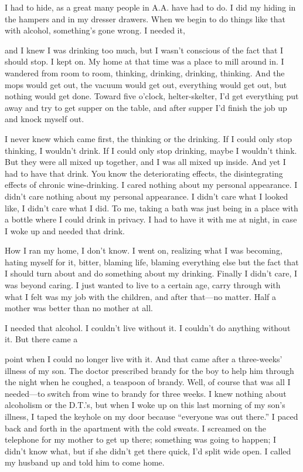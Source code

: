 I had to hide, as a great many people in A.A. have had to do. I did my hiding in the hampers and in my dresser drawers. When we begin to do things like that with alcohol, something’s gone wrong. I needed it,

and I knew I was drinking too much, but I wasn’t conscious of the fact that I should stop. I kept on. My home at that time was a place to mill around in. I wandered from room to room, thinking, drinking, drinking, thinking. And the mops would get out, the vacuum would get out, everything would get out, but nothing would get done. Toward five o’clock, helter-skelter, I’d get everything put away and try to get supper on the table, and after supper I’d finish the job up and knock myself out.

I never knew which came first, the thinking or the drinking. If I could only stop thinking, I wouldn’t drink. If I could only stop drinking, maybe I wouldn’t think. But they were all mixed up together, and I was all mixed up inside. And yet I had to have that drink. You know the deteriorating effects, the disintegrating effects of chronic wine-drinking. I cared nothing about my personal appearance. I didn’t care nothing about my personal appearance. I didn’t care what I looked like, I didn’t care what I did. To me, taking a bath was just being in a place with a bottle where I could drink in privacy. I had to have it with me at night, in case I woke up and needed that drink.

How I ran my home, I don’t know. I went on, realizing what I was becoming, hating myself for it, bitter, blaming life, blaming everything else but the fact that I should turn about and do something about my drinking. Finally I didn’t care, I was beyond caring. I just wanted to live to a certain age, carry through with what I felt was my job with the children, and after that—no matter. Half a mother was better than no mother at all.

I needed that alcohol. I couldn’t live without it. I couldn’t do anything without it. But there came a

point when I could no longer live with it. And that came after a three-weeks’ illness of my son. The doctor prescribed brandy for the boy to help him through the night when he coughed, a teaspoon of brandy. Well, of course that was all I needed—to switch from wine to brandy for three weeks. I knew nothing about alcoholism or the D.T.’s, but when I woke up on this last morning of my son’s illness, I taped the keyhole on my door because “everyone was out there.” I paced back and forth in the apartment with the cold sweats. I screamed on the telephone for my mother to get up there; something was going to happen; I didn’t know what, but if she didn’t get there quick, I’d split wide open. I called my husband up and told him to come home.


